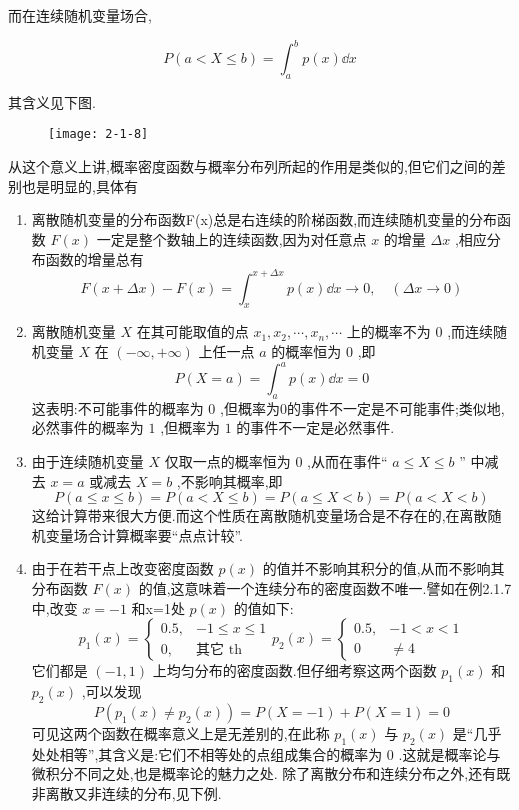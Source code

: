 而在连续随机变量场合,

\[ 
P(a<X \leqslant b)=\int_{a}^{b} p(x) \dd x
\]

其含义见下图.



\begin{figure}
	\centering
	\texttt{[image: 2-1-8]}
	\caption{}
	\label{fig:2.1.8}
\end{figure}

从这个意义上讲,概率密度函数与概率分布列所起的作用是类似的,但它们之间的差别也是明显的,具体有

\begin{enumerate}
	\item 离散随机变量的分布函数F(x)总是右连续的阶梯函数,而连续随机变量的分布函数 $ F(x) $ 一定是整个数轴上的连续函数,因为对任意点 $ x $ 的增量 $ \Delta x $ ,相应分布函数的增量总有
	\[ 
	F(x+\Delta x)-F(x)=\int_{x}^{x+\Delta x} p(x) \dd x \longrightarrow 0, \quad(\Delta x \rightarrow 0)
	\]
	\item 离散随机变量 $ X $ 在其可能取值的点 $ x_{1}, x_{2}, \cdots, x_{n}, \cdots $ 上的概率不为 $ 0 $ ,而连续随机变量 $ X $ 在 $ (-\infty,+\infty) $ 上任一点 $ a $ 的概率恒为 $ 0 $ ,即
	\[ 
	P(X=a)=\int_{a}^{a} p(x) \dd x=0
	\]
	这表明:不可能事件的概率为 $ 0 $ ,但概率为0的事件不一定是不可能事件;类似地,必然事件的概率为 $ 1 $ ,但概率为 $ 1 $ 的事件不一定是必然事件.
	\item 由于连续随机变量 $ X $ 仅取一点的概率恒为 $ 0 $ ,从而在事件“ $ a \leqslant X \leqslant b $ ”
	中减去 $ x=a $ 或减去 $ X=b $ ,不影响其概率,即
	\[ 
	P(a \leqslant x \leqslant b)=P(a<X \leqslant b)=P(a \leqslant X<b)=P(a<X<b)
	\]
	这给计算带来很大方便.而这个性质在离散随机变量场合是不存在的,在离散随机变量场合计算概率要“点点计较”.
	\item 由于在若干点上改变密度函数 $ p(x) $ 的值并不影响其积分的值,从而不影响其分布函数 $ F(x) $ 的值,这意味着一个连续分布的密度函数不唯一.譬如在例2.1.7中,改变 $ x=-1 $ 和x=1处 $ p(x) $ 的值如下:
	\[ 
	p_{1}(x)=\left\{\begin{array}{ll}{0.5,} & {-1 \leqslant x \leqslant 1} \\ {0,} & {\text{其它} \text { th }}\end{array}\right. p_{2}(x)=\left\{\begin{array}{ll}{0.5,} & {-1<x<1} \\ {0} & { \neq 4}\end{array}\right.
	\]
	它们都是 $ (-1,1) $ 上均匀分布的密度函数.但仔细考察这两个函数 $ p_1(x) $ 和 $ p_2(x) $ ,可以发现
	\[ 
	P\left(p_{1}(x) \neq p_{2}(x)\right)=P(X=-1)+P(X=1)=0
	\]
	可见这两个函数在概率意义上是无差别的,在此称 $ p_1(x) $ 与 $ p_2(x) $ 是“几乎处处相等”,其含义是:它们不相等处的点组成集合的概率为 $ 0 $ .这就是概率论与微积分不同之处,也是概率论的魅力之处.
	除了离散分布和连续分布之外,还有既非离散又非连续的分布,见下例.
\end{enumerate}

